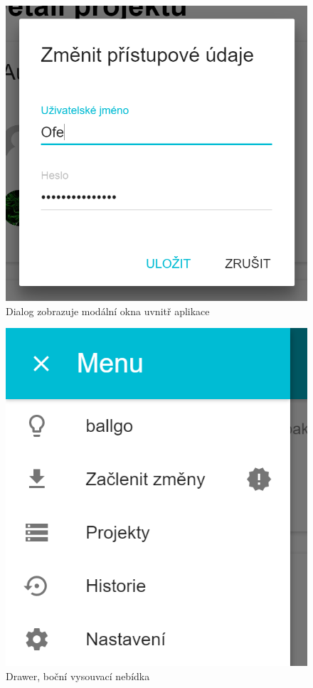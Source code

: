 \begin{figure}[h]
	\centering
	\includegraphics[scale=0.5]{sections/ui/images/Dialog.png}
	\caption[Dialog]{Dialog zobrazuje modální okna uvnitř aplikace}
\end{figure}

\begin{figure}[h]
	\centering
	\includegraphics[scale=0.5]{sections/ui/images/Drawer.png}
	\caption[Drawer]{Drawer, boční vysouvací nebídka}
\end{figure}

